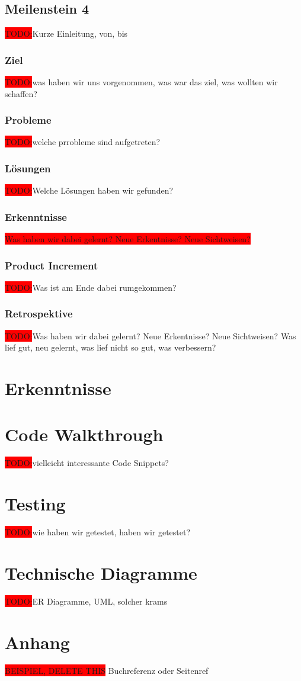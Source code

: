 \documentclass[10pt, a4paper]{article}
\begin{document}
\subsection{Meilenstein 4}
\colorbox{red}{TODO:}Kurze Einleitung, von, bis
\subsubsection{Ziel}
\colorbox{red}{TODO:}was haben wir uns vorgenommen, was war das ziel, was wollten wir schaffen?
\subsubsection{Probleme}
\colorbox{red}{TODO:}welche prrobleme sind aufgetreten?

\subsubsection{Lösungen}
\colorbox{red}{TODO:}Welche Lösungen haben wir gefunden?

\subsubsection{Erkenntnisse}
\colorbox{red}{Was haben wir dabei gelernt? Neue Erkentnisse? Neue Sichtweisen?}

\subsubsection{Product Increment}
\colorbox{red}{TODO:}Was ist am Ende dabei rumgekommen?

\subsubsection{Retrospektive}
\colorbox{red}{TODO:}Was haben wir dabei gelernt? Neue Erkentnisse? Neue Sichtweisen?
Was lief gut, neu gelernt, was lief nicht so gut, was verbessern?

\section{Erkenntnisse}

\section{Code Walkthrough}
\colorbox{red}{TODO:}vielleicht interessante Code Snippets?

\section{Testing}
\colorbox{red}{TODO:}wie haben wir getestet, haben wir getestet?

\section{Technische Diagramme}
\colorbox{red}{TODO:}ER Diagramme, UML, solcher krams

\newpage
\section{Anhang}
\colorbox{red}{BEISPIEL, DELETE THIS} Buchreferenz \cite{Literaturbeispiel:tom} oder Seitenref \cite{google}
\printbibliography
\end{document}

